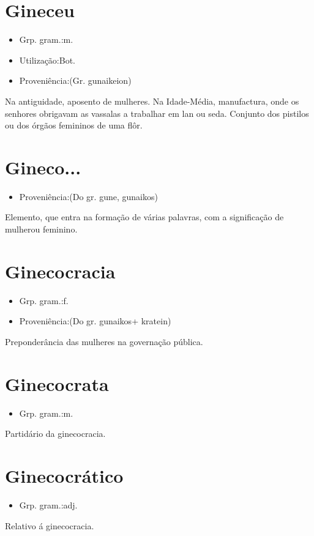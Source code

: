 \section{Gineceu}
\begin{itemize}
\item {Grp. gram.:m.}
\end{itemize}
\begin{itemize}
\item {Utilização:Bot.}
\end{itemize}
\begin{itemize}
\item {Proveniência:(Gr. \textunderscore gunaikeion\textunderscore )}
\end{itemize}
Na antiguidade, aposento de mulheres.
Na Idade-Média, manufactura, onde os senhores obrigavam as vassalas a trabalhar em lan ou seda.
Conjunto dos pistilos ou dos órgãos femininos de uma flôr.
\section{Gineco...}
\begin{itemize}
\item {Proveniência:(Do gr. \textunderscore gune\textunderscore , \textunderscore gunaikos\textunderscore )}
\end{itemize}
Elemento, que entra na formação de várias palavras, com a significação de \textunderscore mulher\textunderscore  ou \textunderscore feminino\textunderscore .
\section{Ginecocracia}
\begin{itemize}
\item {Grp. gram.:f.}
\end{itemize}
\begin{itemize}
\item {Proveniência:(Do gr. \textunderscore gunaikos\textunderscore  + \textunderscore kratein\textunderscore )}
\end{itemize}
Preponderância das mulheres na governação pública.
\section{Ginecocrata}
\begin{itemize}
\item {Grp. gram.:m.}
\end{itemize}
Partidário da ginecocracia.
\section{Ginecocrático}
\begin{itemize}
\item {Grp. gram.:adj.}
\end{itemize}
Relativo á ginecocracia.
